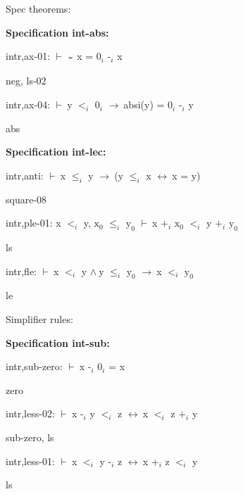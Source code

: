 \documentclass[a4paper]{article}
\newcommand{\tildesym}{\raisebox{-4pt}{\bf\~{}}}
\newcommand{\Fol}{\mbox{$\vdash\ $}}
\newcommand{\And}{\mbox{$\wedge\ $}}
\newcommand{\Imp}{\mbox{$\rightarrow\ $}}
\newcommand{\Equiv}{\mbox{$\leftrightarrow\ $}}
\begin{document}
\raggedright
              
Spec theorems: 


{\bf Specification int-abs:}

intr,ax-01: 
 \Fol $\tildesym$ x = $\mbox{0}_{i}$ $\mbox{-}_{i}$ x



neg, ls-02

\bigskip

intr,ax-04: 
 \Fol y $\mbox{$<$}_{i}$ $\mbox{0}_{i}$ \Imp absi(y) = $\mbox{0}_{i}$ $\mbox{-}_{i}$ y



abs

\bigskip

{\bf Specification int-lec:}

intr,anti: 
 \Fol x $\mbox{$\le$}_{i}$ y \Imp (y $\mbox{$\le$}_{i}$ x \Equiv x = y)



square-08

\bigskip

intr,ple-01: 
x $\mbox{$<$}_{i}$ y, 
$\mbox{x}_{0}$ $\mbox{$\le$}_{i}$ $\mbox{y}_{0}$
 \Fol x $\mbox{+}_{i}$ $\mbox{x}_{0}$ $\mbox{$<$}_{i}$ y $\mbox{+}_{i}$ $\mbox{y}_{0}$



ls

\bigskip

intr,fle: 
 \Fol x $\mbox{$<$}_{i}$ y \And y $\mbox{$\le$}_{i}$ $\mbox{y}_{0}$ \Imp x $\mbox{$<$}_{i}$ $\mbox{y}_{0}$



le

\bigskip




Simplifier rules: 


{\bf Specification int-sub:}

intr,sub-zero: 
 \Fol x $\mbox{-}_{i}$ $\mbox{0}_{i}$ = x



zero

\bigskip

intr,less-02: 
 \Fol x $\mbox{-}_{i}$ y $\mbox{$<$}_{i}$ z \Equiv x $\mbox{$<$}_{i}$ z $\mbox{+}_{i}$ y



sub-zero, ls

\bigskip

intr,less-01: 
 \Fol x $\mbox{$<$}_{i}$ y $\mbox{-}_{i}$ z \Equiv x $\mbox{+}_{i}$ z $\mbox{$<$}_{i}$ y



ls
\end{document}
